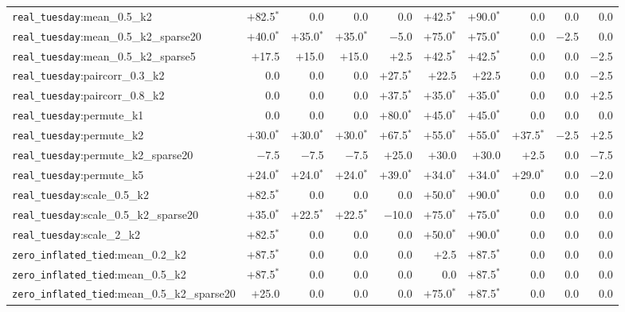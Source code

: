 \begin{table}[!tp]
\begin{tabular*}{\textwidth}{@{\extracolsep{\fill}}lrrrrrrrrr}
\texttt{real\_tuesday}:mean\_0.5\_k2 & $+$82.5$^{*}$ & 0.0 & 0.0 & 0.0 & $+$42.5$^{*}$ & $+$90.0$^{*}$ & 0.0 & 0.0 & 0.0 \\
\texttt{real\_tuesday}:mean\_0.5\_k2\_sparse20 & $+$40.0$^{*}$ & $+$35.0$^{*}$ & $+$35.0$^{*}$ & $-$5.0 & $+$75.0$^{*}$ & $+$75.0$^{*}$ & 0.0 & $-$2.5 & 0.0 \\
\texttt{real\_tuesday}:mean\_0.5\_k2\_sparse5 & $+$17.5 & $+$15.0 & $+$15.0 & $+$2.5 & $+$42.5$^{*}$ & $+$42.5$^{*}$ & 0.0 & 0.0 & $-$2.5 \\
\texttt{real\_tuesday}:paircorr\_0.3\_k2 & 0.0 & 0.0 & 0.0 & $+$27.5$^{*}$ & $+$22.5 & $+$22.5 & 0.0 & 0.0 & $-$2.5 \\
\texttt{real\_tuesday}:paircorr\_0.8\_k2 & 0.0 & 0.0 & 0.0 & $+$37.5$^{*}$ & $+$35.0$^{*}$ & $+$35.0$^{*}$ & 0.0 & 0.0 & $+$2.5 \\
\texttt{real\_tuesday}:permute\_k1 & 0.0 & 0.0 & 0.0 & $+$80.0$^{*}$ & $+$45.0$^{*}$ & $+$45.0$^{*}$ & 0.0 & 0.0 & 0.0 \\
\texttt{real\_tuesday}:permute\_k2 & $+$30.0$^{*}$ & $+$30.0$^{*}$ & $+$30.0$^{*}$ & $+$67.5$^{*}$ & $+$55.0$^{*}$ & $+$55.0$^{*}$ & $+$37.5$^{*}$ & $-$2.5 & $+$2.5 \\
\texttt{real\_tuesday}:permute\_k2\_sparse20 & $-$7.5 & $-$7.5 & $-$7.5 & $+$25.0 & $+$30.0 & $+$30.0 & $+$2.5 & 0.0 & $-$7.5 \\
\texttt{real\_tuesday}:permute\_k5 & $+$24.0$^{*}$ & $+$24.0$^{*}$ & $+$24.0$^{*}$ & $+$39.0$^{*}$ & $+$34.0$^{*}$ & $+$34.0$^{*}$ & $+$29.0$^{*}$ & 0.0 & $-$2.0 \\
\texttt{real\_tuesday}:scale\_0.5\_k2 & $+$82.5$^{*}$ & 0.0 & 0.0 & 0.0 & $+$50.0$^{*}$ & $+$90.0$^{*}$ & 0.0 & 0.0 & 0.0 \\
\texttt{real\_tuesday}:scale\_0.5\_k2\_sparse20 & $+$35.0$^{*}$ & $+$22.5$^{*}$ & $+$22.5$^{*}$ & $-$10.0 & $+$75.0$^{*}$ & $+$75.0$^{*}$ & 0.0 & 0.0 & 0.0 \\
\texttt{real\_tuesday}:scale\_2\_k2 & $+$82.5$^{*}$ & 0.0 & 0.0 & 0.0 & $+$50.0$^{*}$ & $+$90.0$^{*}$ & 0.0 & 0.0 & 0.0 \\
\midrule
\texttt{zero\_inflated\_tied}:mean\_0.2\_k2 & $+$87.5$^{*}$ & 0.0 & 0.0 & 0.0 & $+$2.5 & $+$87.5$^{*}$ & 0.0 & 0.0 & 0.0 \\
\texttt{zero\_inflated\_tied}:mean\_0.5\_k2 & $+$87.5$^{*}$ & 0.0 & 0.0 & 0.0 & 0.0 & $+$87.5$^{*}$ & 0.0 & 0.0 & 0.0 \\
\texttt{zero\_inflated\_tied}:mean\_0.5\_k2\_sparse20 & $+$25.0 & 0.0 & 0.0 & 0.0 & $+$75.0$^{*}$ & $+$87.5$^{*}$ & 0.0 & 0.0 & 0.0 \\

\end{tabular*}
\end{table}
